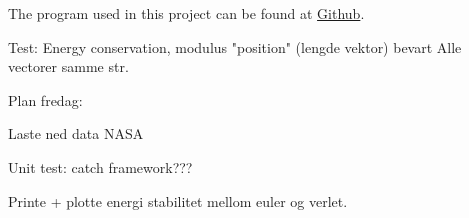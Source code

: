 


The program used in this project can be found at \href{https://github.com/kjetka/Project3}{Github}. 




Test: 		Energy conservation, modulus "position" (lengde vektor) bevart
				Alle vectorer samme str.


Plan fredag:

	Laste ned data NASA


	Unit test: catch framework???

	Printe + plotte energi stabilitet mellom euler og verlet.

